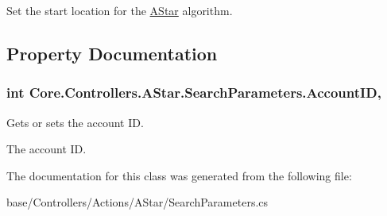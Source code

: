 Set the start location for the \hyperlink{namespaceCore_1_1Controllers_1_1AStar}{A\+Star} algorithm. 



\subsection{Property Documentation}
\hypertarget{classCore_1_1Controllers_1_1AStar_1_1SearchParameters_a33d7257ae43101ed5fbddee79c1a5a27}{}
\subsubsection[{Account\+I\+D}]{\setlength{\rightskip}{0pt plus 5cm}int Core.\+Controllers.\+A\+Star.\+Search\+Parameters.\+Account\+I\+D\hspace{0.3cm}{\ttfamily [get]}, {\ttfamily [set]}}\label{classCore_1_1Controllers_1_1AStar_1_1SearchParameters_a33d7257ae43101ed5fbddee79c1a5a27}


Gets or sets the account I\+D. 

The account I\+D.

The documentation for this class was generated from the following file\+:\begin{DoxyCompactItemize}
\item 
base/\+Controllers/\+Actions/\+A\+Star/Search\+Parameters.\+cs\end{DoxyCompactItemize}
